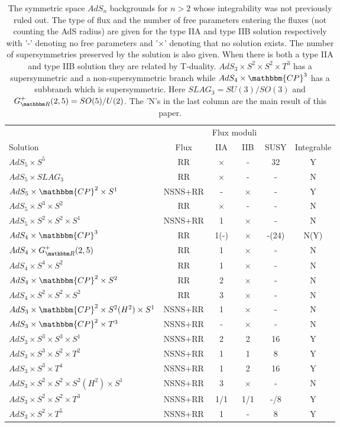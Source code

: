 \documentclass[a4paper,11pt]{article}
\begin{document}
\begin{table}[ht]
\begin{center}
\begin{tabular}{lccccc}
& & \multicolumn{2}{c}{Flux moduli} & &\\
Solution & Flux & IIA & IIB & SUSY & Integrable\\
\hline
$AdS_5\times S^5$ & RR & $\times$ & - & 32 & Y\\
$AdS_5\times SLAG_3$ & RR & $\times$ & - & - & N\\
$AdS_5\times\mathbbm{CP}^2\times S^1$ & NSNS+RR & - & $\times$ & - & Y\\
$AdS_5\times S^3\times S^2$ & RR  & $\times$ & - & - & N\\
$AdS_5\times S^2\times S^2\times S^1$ & NSNS+RR & 1 & $\times$ & - & N\\
$AdS_4\times\mathbbm{CP}^3$ & RR  & 1(-) & $\times$ & -(24) & N(Y)\\
$AdS_4\times G_{\mathbbm R}^+(2,5)$ & RR  & 1 & $\times$ & - & N\\
$AdS_4\times S^4\times S^2$ & RR  & 1 & $\times$ & - & N\\
$AdS_4\times\mathbbm{CP}^2\times S^2$ & RR  & 2 & $\times$ & - & N\\
$AdS_4\times S^2\times S^2\times S^2$ & RR  & 3 & $\times$ & - & N\\
$AdS_3\times\mathbbm{CP}^2\times S^2(H^2)\times S^1$ & NSNS+RR & 1 & $\times$ & - & N\\
$AdS_3\times\mathbbm{CP}^2\times T^3$ & NSNS+RR & - & $\times$ & - & N\\
$AdS_3\times S^3\times S^3\times S^1$ & NSNS+RR & 2 & 2 & 16 & Y\\
$AdS_3\times S^3\times S^2\times T^2$ & NSNS+RR & 1 & 1 & 8 & Y\\
$AdS_3\times S^3\times T^4$ & NSNS+RR & 1 & 2 & 16 & Y\\
$AdS_3\times S^2\times S^2\times S^2(H^2)\times S^1$ & NSNS+RR & 3 & $\times$ & - & N\\
$AdS_3\times S^2\times S^2\times T^3$ & NSNS+RR & 1/1 & 1/1 & -/8 & Y\\
$AdS_3\times S^2\times T^5$ & NSNS+RR & 1 & - & 8 & Y\\
\end{tabular}
\caption{The symmetric space $AdS_n$ backgrounds for $n>2$ whose integrability was not previously ruled out. The type of flux and the number of free parameters entering the fluxes (not counting the AdS radius) are given for the type IIA and type IIB solution respectively with '-' denoting no free parameters and '$\times$' denoting that no solution exists. The number of supersymmetries preserved by the solution is also given. When there is both a type IIA and type IIB solution they are related by T-duality. $AdS_3\times S^2\times S^2\times T^3$ has a supersymmetric and a non-supersymmetric branch while $AdS_4\times\mathbbm{CP}^3$ has a subbranch which is supersymmetric. Here $SLAG_3=SU(3)/SO(3)$ and $G_{\mathbbm R}^+(2,5)=SO(5)/U(2)$. The 'N's in the last column are the main result of this paper.}
\label{tab:backgrounds}
\end{center}
\end{table}
\end{document}
